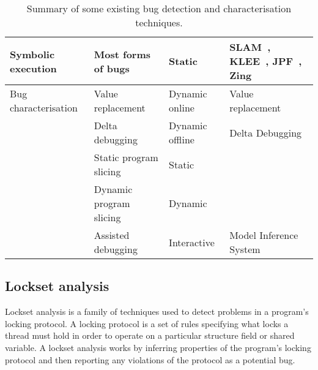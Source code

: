 \begin{sidewaystable}
\begin{tabular}{l>{\raggedright}p{5.5cm}lp{11cm}}
    \hdashline
    Symbolic execution         & Most forms of bugs                           & Static          & SLAM~\cite{Ball2011}, KLEE~\cite{Cadar}, JPF~\cite{Havelund2000}, Zing~\cite{Andrews2004} \\
    \hline
    Bug characterisation       & Value replacement                            & Dynamic online  & Value replacement~\cite{Jeffrey2009} \\
                               & Delta debugging                              & Dynamic offline & Delta Debugging~\cite{Cleve2005,Choi2002} \\
                               & Static program slicing                       & Static          & \todo{...} \\
                               & Dynamic program slicing                      & Dynamic         & \todo{...} \\
                               & Assisted debugging                           & Interactive     & Model Inference System~\cite{Shapiro1982} \\
  \end{tabular}
  \caption{Summary of some existing bug detection and characterisation
    techniques.}
  \label{table:rw:find_char}
\end{sidewaystable}



\subsection{Lockset analysis}

Lockset analysis is a family of techniques used to detect problems in
a program's locking protocol.  A locking protocol is a set of rules
specifying what locks a thread must hold in order to operate on a
particular structure field or shared variable.  A lockset analysis
works by inferring properties of the program's locking protocol and
then reporting any violations of the protocol as a potential bug.

